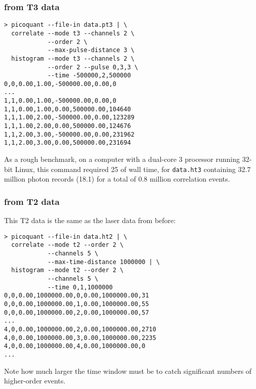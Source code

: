 \subsubsection{ from T3 data}
\begin{verbatim}
> picoquant --file-in data.pt3 | \
  correlate --mode t3 --channels 2 \
            --order 2 \
            --max-pulse-distance 3 \
  histogram --mode t3 --channels 2 \
            --order 2 --pulse 0,3,3 \
            --time -500000,2,500000
0,0,0.00,1.00,-500000.00,0.00,0
...
1,1,0.00,1.00,-500000.00,0.00,0
1,1,0.00,1.00,0.00,500000.00,104640
1,1,1.00,2.00,-500000.00,0.00,123289
1,1,1.00,2.00,0.00,500000.00,124676
1,1,2.00,3.00,-500000.00,0.00,231962
1,1,2.00,3.00,0.00,500000.00,231694
\end{verbatim}
As a rough benchmark, on a computer with a dual-core 3\giga\hertz{} processor running 32-bit Linux, this command required 25\second{} of wall time, for \texttt{data.ht3} containing 32.7 million photon records (18.1\kilo\cps) for a total of 0.8 million correlation events.

\subsubsection{\gn{3} from T2 data}
This T2 data is the same as the laser data from before:
\begin{verbatim}
> picoquant --file-in data.ht2 | \
  correlate --mode t2 --order 2 \
            --channels 5 \
            --max-time-distance 1000000 | \
  histogram --mode t2 --order 2 \
            --channels 5 \
            --time 0,1,1000000
0,0,0.00,1000000.00,0,0.00,1000000.00,31
0,0,0.00,1000000.00,1,0.00,1000000.00,55
0,0,0.00,1000000.00,2,0.00,1000000.00,57
...
4,0,0.00,1000000.00,2,0.00,1000000.00,2710
4,0,0.00,1000000.00,3,0.00,1000000.00,2235
4,0,0.00,1000000.00,4,0.00,1000000.00,0
...
\end{verbatim}
Note how much larger the time window must be to catch significant numbers of higher-order events.

